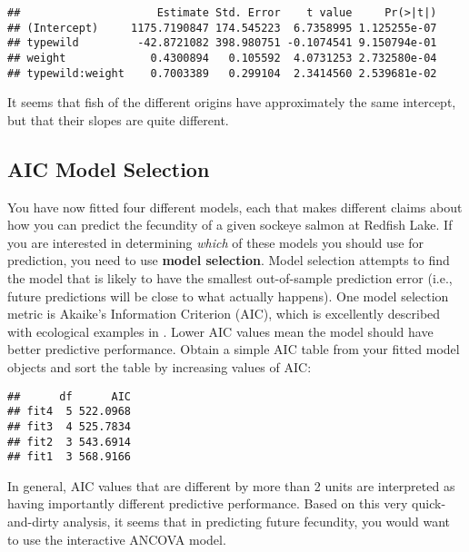 \documentclass[]{book}
\newenvironment{Shaded}{\begin{snugshade}}{\end{snugshade}}
\newcommand{\KeywordTok}[1]{\textcolor[rgb]{0.13,0.29,0.53}{\textbf{#1}}}
\newcommand{\StringTok}[1]{\textcolor[rgb]{0.31,0.60,0.02}{#1}}
\newcommand{\OperatorTok}[1]{\textcolor[rgb]{0.81,0.36,0.00}{\textbf{#1}}}
\newcommand{\NormalTok}[1]{#1}
\theoremstyle{definition}
\theoremstyle{definition}
\theoremstyle{definition}
\theoremstyle{remark}
\begin{document}
\begin{verbatim}
##                     Estimate Std. Error    t value     Pr(>|t|)
## (Intercept)     1175.7190847 174.545223  6.7358995 1.125255e-07
## typewild         -42.8721082 398.980751 -0.1074541 9.150794e-01
## weight             0.4300894   0.105592  4.0731253 2.732580e-04
## typewild:weight    0.7003389   0.299104  2.3414560 2.539681e-02
\end{verbatim}

It seems that fish of the different origins have approximately the same
intercept, but that their slopes are quite different.

\subsection{AIC Model Selection}\label{aic-model-selection}

You have now fitted four different models, each that makes different
claims about how you can predict the fecundity of a given sockeye salmon
at Redfish Lake. If you are interested in determining \emph{which} of
these models you should use for prediction, you need to use
\textbf{model selection}. Model selection attempts to find the model
that is likely to have the smallest out-of-sample prediction error
(i.e., future predictions will be close to what actually happens). One
model selection metric is Akaike's Information Criterion (AIC), which is
excellently described with ecological examples in \citet{aic-cite}.
Lower AIC values mean the model should have better predictive
performance. Obtain a simple AIC table from your fitted model objects
and sort the table by increasing values of AIC:

\begin{Shaded}
\end{Shaded}

\begin{verbatim}
##      df      AIC
## fit4  5 522.0968
## fit3  4 525.7834
## fit2  3 543.6914
## fit1  3 568.9166
\end{verbatim}

In general, AIC values that are different by more than 2 units are
interpreted as having importantly different predictive performance.
Based on this very quick-and-dirty analysis, it seems that in predicting
future fecundity, you would want to use the interactive ANCOVA model.
\end{document}
